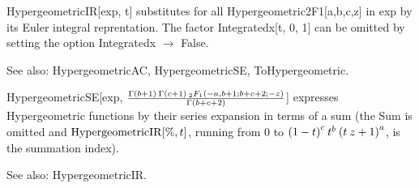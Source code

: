 

HypergeometricIR[exp, t] substitutes for all Hypergeometric2F1[a,b,c,z] in exp by its Euler integral reprentation. The factor
  Integratedx[t, 0, 1] can be omitted by setting the option Integratedx \(\rightarrow \) False.

See also:  HypergeometricAC, HypergeometricSE, ToHypergeometric.












HypergeometricSE[exp, \(\frac{\Gamma (b+1)\> \Gamma (c+1)\> {{\relax }_2}{F_1}(-a,b+1;b+c+2;-z)}
   {\Gamma (b+c+2)}\)] expresses Hypergeometric functions by their series expansion in terms of a sum (the Sum is omitted and \(\mathrm{HypergeometricIR}[\%,t]\),
running from 0 to \({{(1-t)}^c}\> {t^b}\> {{(t\> z+1)}^a}\), is the summation index).

\dispSFinmath{
\nu 
}

\dispSFoutmath{
\nu 
}

See also:  HypergeometricIR.


